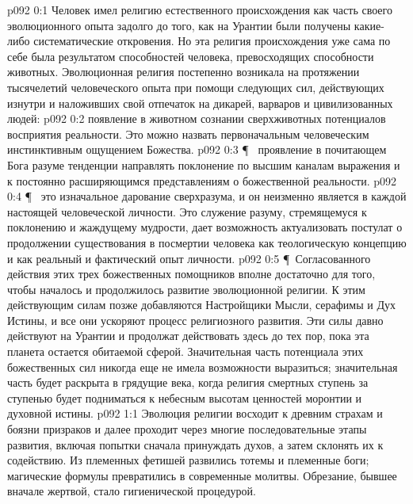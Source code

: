 \vs p092 0:1 Человек имел религию естественного происхождения как часть своего эволюционного опыта задолго до того, как на Урантии были получены какие\hyp{}либо систематические откровения. Но эта религия  происхождения уже сама по себе была результатом способностей человека, превосходящих способности животных. Эволюционная религия постепенно возникала на протяжении тысячелетий человеческого опыта при помощи следующих сил, действующих изнутри и наложивших свой отпечаток на дикарей, варваров и цивилизованных людей:
\vs p092 0:2 \bibnobreakspace {} появление в животном сознании сверхживотных потенциалов восприятия реальности. Это можно назвать первоначальным человеческим инстинктивным ощущением Божества.
\vs p092 0:3 \P\ \bibnobreakspace {} проявление в почитающем Бога разуме тенденции направлять поклонение по высшим каналам выражения и к постоянно расширяющимся представлениям о божественной реальности.
\vs p092 0:4 \P\ \bibnobreakspace {} это изначальное дарование сверхразума, и он неизменно является в каждой настоящей человеческой личности. Это служение разуму, стремящемуся к поклонению и жаждущему мудрости, дает возможность актуализовать постулат о продолжении существования в посмертии человека как теологическую концепцию и как реальный и фактический опыт личности.
\vs p092 0:5 \P\ Согласованного действия этих трех божественных помощников вполне достаточно для того, чтобы началось и продолжилось развитие эволюционной религии. К этим действующим силам позже добавляются Настройщики Мысли, серафимы и Дух Истины, и все они ускоряют процесс религиозного развития. Эти силы давно действуют на Урантии и продолжат действовать здесь до тех пор, пока эта планета остается обитаемой сферой. Значительная часть потенциала этих божественных сил никогда еще не имела возможности выразиться; значительная часть будет раскрыта в грядущие века, когда религия смертных ступень за ступенью будет подниматься к небесным высотам ценностей моронтии и духовной истины.
\vs p092 1:1 Эволюция религии восходит к древним страхам и боязни призраков и далее проходит через многие последовательные этапы развития, включая попытки сначала принуждать духов, а затем склонять их к содействию. Из племенных фетишей развились тотемы и племенные боги; магические формулы превратились в современные молитвы. Обрезание, бывшее вначале жертвой, стало гигиенической процедурой.
